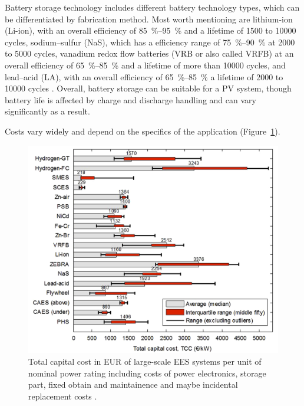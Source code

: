 Battery storage technology includes different battery technology types, which can be differentiated by fabrication method. Most worth mentioning are lithium-ion (Li-ion), with an overall efficiency of \SIrange{85}{95}{\percent} and a lifetime of \num{1500} to \num{10000} cycles, sodium–sulfur (NaS), which has a efficiency range of \SIrange{75}{90}{\percent} at \num{2000} to \num{5000} cycles, vanadium redox flow batteries (VRB or also called VRFB) at an overall efficiency of \SIrange{65}{85}{\percent} and a lifetime of more than \num{10000} cycles, and lead–acid (LA), with an overall efficiency of \SIrange{65}{85}{\percent} a lifetime of \num{2000} to \num{10000} cycles \cite{IEA2014c,Zakeri2015}. Overall, battery storage can be suitable for a PV system, though battery life is affected by charge and discharge handling and can vary significantly as a result.



Costs vary widely and depend on the specifics of the application (Figure~\ref{TCC_EES}).


\begin{figure}[htbp]  
\centering
\includegraphics[width=0.65\linewidth]{FIG/TCC_EES}
\caption[Total capital cost in EUR of large-scale EES systems per unit of nominal power rating including costs of power electronics, storage part, fixed obtain and maintainence and maybe incidental replacement costs.]{Total capital cost in EUR of large-scale EES systems per unit of nominal power rating including costs of power electronics, storage part, fixed obtain and maintainence and maybe incidental replacement costs \cite{Zakeri2015}.}\label{TCC_EES}
\end{figure}

